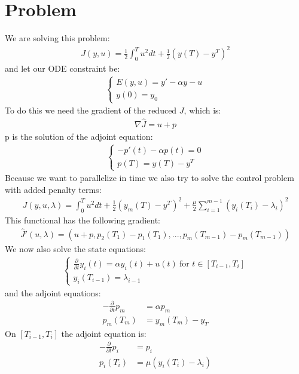 \documentclass[11pt,a4paper]{report}
\begin{document}
\section{Problem}
We are solving this problem:
\begin{gather*}
J(y,u) = \frac{1}{2}\int_0^Tu^2dt + \frac{1}{2}(y(T)-y^T)^2
\end{gather*} 
and let our ODE constraint be:
\begin{align*}
\left\{
     \begin{array}{lr}
       	E(y,u) = y'-\alpha y -u\\
       	   y(0)=y_0
     \end{array}
   \right.
\end{align*}
To do this we need the gradient of the reduced $J$, which is:
\begin{align*}
\nabla\hat{J} = u+p
\end{align*}
p is the solution of the adjoint equation:
\begin{align*}
   \left\{
     \begin{array}{lr}
       -p'(t) -\alpha p(t)=0  \\
       p(T) = y(T)-y^T
     \end{array}
   \right.
\end{align*}
Because we want to parallelize in time we also try to solve the control problem with added penalty terms:
\begin{align*}
J(y,u,\lambda) = \int_0^T u^2 dt + \frac{1}{2}(y_m(T)-y^T)^2 + \frac{\mu}{2} \sum_{i=1}^{m-1} (y_{i}(T_i)-\lambda_i)^2 
\end{align*}
This functional has the following gradient:
\begin{align*}
\hat{J}'(u,\lambda) = (u+p,p_{2}(T_1) -p_{1}(T_1),..., p_{m}(T_{m-1}) -p_{m}(T_{m-1}))
\end{align*} 
We now also solve the state equations:
\begin{align*}
   \left\{
     \begin{array}{lr}
       \frac{\partial }{\partial t} y_i(t) = \alpha y_i(t) + u(t) \ \text{for $t \in [T_{i-1},T_{i}]$}\\
	y_i(T_{i-1}) = \lambda_{i-1}
     \end{array}
   \right.
\end{align*}
and the adjoint equations:
\begin{align*}
-\frac{\partial }{\partial t}p_m &=\alpha p_m  \\
p_m(T_{m}) &= y_m(T_{m})-y_T
\end{align*}
On $[T_{i-1},T_i]$ the adjoint equation is:
\begin{align*}
-\frac{\partial }{\partial t}p_i &=p_i  \\
p_i(T_{i}) &= \mu(y_{i}(T_{i})-\lambda_{i} )
\end{align*}
\end{document}
